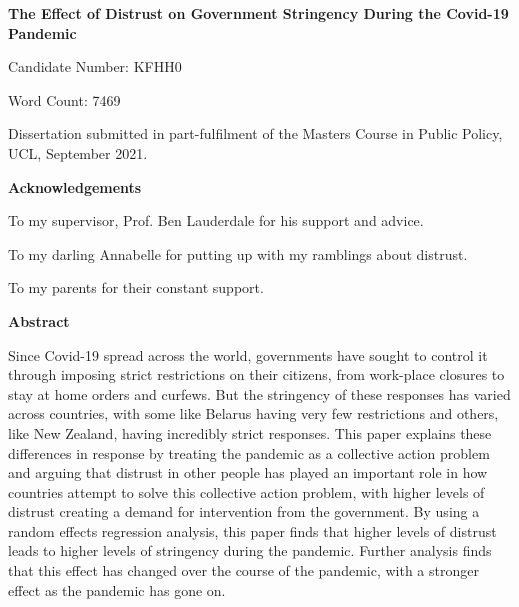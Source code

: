 \documentclass[
  11pt,
]{article}
\author{}
\date{\vspace{-2.5em}}
\begin{document}
\begin{titlepage}
\begin{center}
\vspace*{5cm}
\LARGE
\textbf{The Effect of Distrust on Government Stringency During the Covid-19 Pandemic}


\vspace{1.5cm}
\large
Candidate Number: KFHH0

\vspace{0.5cm}
Word Count: 7469

\vfill

Dissertation submitted in part-fulfilment of the Masters Course in Public Policy, UCL,  September 2021.

\end{center}
\end{titlepage}

\begin{center}
\textbf{Acknowledgements}

To my supervisor, Prof. Ben Lauderdale for his support and advice.

To my darling Annabelle for putting up with my ramblings about distrust.

To my parents for their constant support.
\end{center}

\pagebreak

\begin{center}
\vspace*{5cm}
\textbf{Abstract}
\end{center}
Since Covid-19 spread across the world, governments have sought to control it through imposing strict restrictions on their citizens, from work-place closures to stay at home orders and curfews. But the stringency of these responses has varied across countries, with some like Belarus having very few restrictions and others, like New Zealand, having incredibly strict responses. This paper explains these differences in response by treating the pandemic as a collective action problem and arguing that distrust in other people has played an important role in how countries attempt to solve this collective action problem, with higher levels of distrust creating a demand for intervention from the government. By using a random effects regression analysis, this paper finds that higher levels of distrust leads to higher levels of stringency during the pandemic. Further analysis finds that this effect has changed over the course of the pandemic, with a stronger effect as the pandemic has gone on.
\pagebreak
\end{document}
